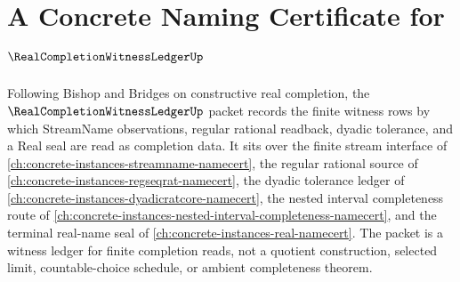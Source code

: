 \chapter{A Concrete Naming Certificate for $\RealCompletionWitnessLedgerUp$}
\label{ch:concrete-instances-real-completion-witness-ledger-namecert}

Following Bishop and Bridges on constructive real completion, the $\RealCompletionWitnessLedgerUp$ packet records the finite witness rows by which StreamName observations, regular rational readback, dyadic tolerance, and a Real seal are read as completion data. It sits over the finite stream interface of \autoref{ch:concrete-instances-streamname-namecert}, the regular rational source of \autoref{ch:concrete-instances-regseqrat-namecert}, the dyadic tolerance ledger of \autoref{ch:concrete-instances-dyadicratcore-namecert}, the nested interval completeness route of \autoref{ch:concrete-instances-nested-interval-completeness-namecert}, and the terminal real-name seal of \autoref{ch:concrete-instances-real-namecert}. The packet is a witness ledger for finite completion reads, not a quotient construction, selected limit, countable-choice schedule, or ambient completeness theorem.

